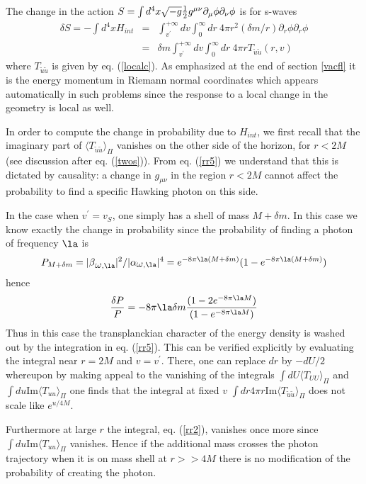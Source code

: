 The change in the action $S=\int d^4x \sqrt{-g} {1\over 2}
g^{\mu\nu} \partial_\mu \phi \partial_\nu \phi$ is for s-waves
\begin{eqnarray}
\delta S = - \int d^4 x H_{int} &=& \int_{v^\prime}^{+\infty}\!dv
\int_0^\infty\!dr \ 4 \pi r^2 (\delta m/r) \partial_r\phi \partial_r\phi
\nonumber\\
&=& \delta m \int_{v^\prime}^{+\infty}\!dv
\int_0^\infty\!dr \ 4 \pi r  T_{\tilde u \tilde u}(r,v)
\label{rr5}\end{eqnarray}
where $ T_{\tilde u \tilde u}$ is given by eq. (\ref{localc}).
As emphasized
at the end of section \ref{vacfl} it is the energy
momentum in Riemann normal coordinates which appears automatically in such
problems since the response to a local change in the geometry is local as
well.

In order to compute the change in probability due to $H_{int}$, we first
recall that the imaginary part of $\langle  T_{\tilde u \tilde u}
\rangle_{\Pi}$ vanishes on
the other side of the horizon, for
$r<2M$ (see discussion after eq. (\ref{twos})). From eq. (\ref{rr5}) we
understand
that this is dictated by causality: a change in $g_{\mu\nu}$ in the region
$r<2M$ cannot affect the probability to find a specific Hawking photon on this
side.

In the case when $v^\prime = v_S$, one simply has a shell of  mass $M+\delta
m$. In this case we know exactly the change in probability since the
probability of finding a photon of frequency $\la$ is \begin{equation}
P_{M+\delta m}
= |\be_{\om,\la}|^2/|\alpha_{\om,\la}|^4
=e^{-8 \pi \la (M+\delta m)} (1 - e^{-8 \pi \la (M+\delta m)})
\end{equation}
hence
\begin{equation}
{\delta P\over P} = -8\pi \la \delta m {(1 - 2e^{-8 \pi \la M})
\over (1 - e^{-8 \pi \la M})}
\end{equation}
Thus in this case the transplanckian character of the energy density is
washed out by the integration in eq. (\ref{rr5}). This can be verified
explicitly by evaluating the integral near $r=2M$ and  $v=v^\prime$.
There, one can
replace $dr$ by $-dU/2$ whereupon by making appeal to the vanishing of the
integrals $\int\! dU\! \langle T_{UU}\rangle_\Pi$ and $\int\! du
\mbox{Im}\langle T_{uu}\rangle_\Pi$ one finds
that the integral at fixed $v$ $\int\!
dr 4 \pi r \mbox{Im}
\langle T_{\tilde u\tilde u} \rangle_\Pi$ does not scale like $e^{u/4M}$.

Furthermore at large $r$ the integral, eq. (\ref{rr2}),
vanishes once more since $\int\! du
\mbox{Im}\langle T_{uu}\rangle_\Pi$ vanishes.
Hence if the additional mass
crosses the photon trajectory when it is on mass shell at $r>>4M$ there is no
modification of the probability of creating the photon.

